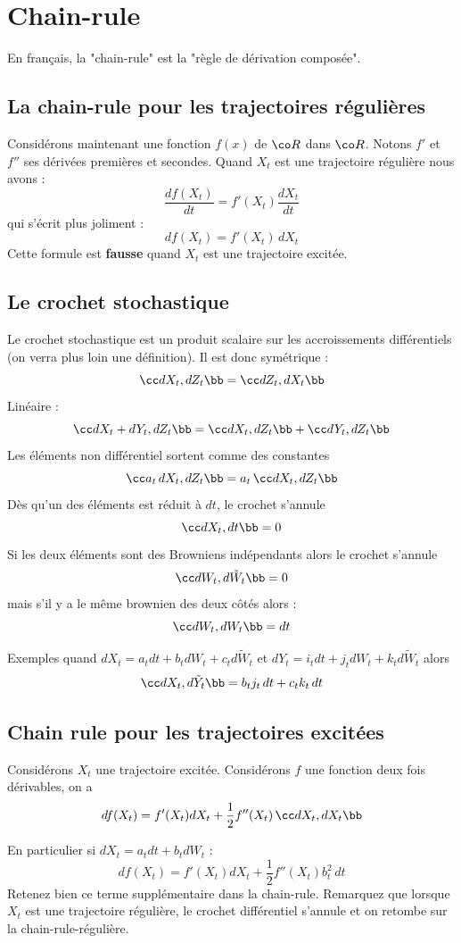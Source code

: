 \documentclass{article}
\begin{document}
 
\section{Chain-rule}

En français, la "chain-rule" est la "règle de dérivation composée".

\subsection{La chain-rule pour les trajectoires régulières}

Considérons maintenant une fonction $f(x)$ de  $\co R$ dans $\co R$.  Notons $f'$ et $f''$ ses dérivées premières et secondes.
Quand $X_t$ est une trajectoire régulière nous avons : 
$$
\frac {d f(X_t)}{dt} = f'(X_t)      \frac{dX_t}{dt} 
$$
qui s'écrit plus joliment :  
$$
d f(X_t) = f'(X_t) \, dX_t 
$$
Cette formule est {\bf fausse} quand $X_t$ est une trajectoire excitée.


\subsection{Le crochet stochastique}

Le crochet stochastique est un produit scalaire sur les accroissements différentiels (on verra plus loin une définition). Il est donc symétrique :
$$
\cc dX_t , dZ_t\bb=\cc  dZ_t, dX_t\bb
$$
Linéaire :
$$
\cc dX_t + dY_t, dZ_t\bb  = \cc dX_t , dZ_t\bb+\cc dY_t, dZ_t\bb
$$
Les éléments non différentiel sortent comme des constantes
$$
 \cc a_t\, dX_t , dZ_t\bb  =a_t\,  \cc  dX_t , dZ_t\bb
$$
Dès qu'un des éléments est réduit à $dt$, le crochet s'annule
$$
\cc dX_t, dt\bb =0 
$$
Si les deux éléments sont des Browniens indépendants alors le crochet s'annule
$$
\cc dW_t, d\tilde W_t  \bb =0 
$$
mais s'il y a le même brownien des deux côtés alors :
$$
\cc dW_t, d W_t  \bb = dt
$$


Exemples quand $dX_t = a_t dt +  b_t  dW_t + c_t d\tilde W_t$ et $d Y_t = i_t dt + j_t dW_t + k_t d\tilde W_t$ alors
\begin{alignat*}{1}
\cc dX_t, d \tilde Y_t   \bb = b_t j_t \, dt + c_tk_t \, dt
\end{alignat*}


\subsection{Chain rule pour les trajectoires excitées}


\begin{theoreme} Considérons $X_t$ une trajectoire excitée. Considérons $f$ une fonction deux fois dérivables, on a 
$$
df(X_t) = f'(X_t) dX_t   +   \frac 1 2 f''(X_t) \, \cc dX_t,dX_t\bb
$$
\end{theoreme}
En particulier si $dX_t =a_t dt + b_t dW_t$ : 
$$
df(X_t) = f'(X_t) dX_t   +   \frac 1 2 f''(X_t)  b_t^2 \, dt
$$
Retenez bien ce terme supplémentaire dans la chain-rule.  
Remarquez que lorsque $X_t$ est une trajectoire régulière, le crochet différentiel s'annule et on retombe sur la chain-rule-régulière. 
\end{document}
